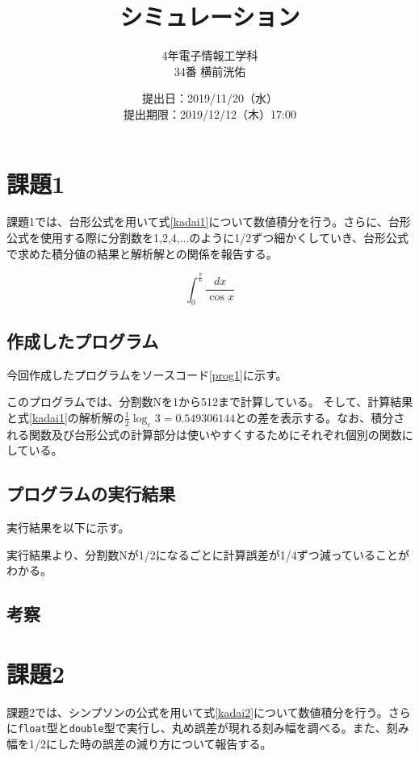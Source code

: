 \documentclass[10pt,titlepage]{jsarticle}
\title{シミュレーション}
\author{4年電子情報工学科\\34番 横前洸佑}
\date{提出日：2019/11/20（水）\\	提出期限：2019/12/12（木）17:00}
\begin{document}
\maketitle

\section{課題1}
課題1では、台形公式を用いて式\ref{kadai1}について数値積分を行う。さらに、台形公式を使用する際に分割数を1,2,4,...のように1/2ずつ細かくしていき、台形公式で求めた積分値の結果と解析解との関係を報告する。

\begin{equation}
\label{kadai1}
	\int_0^\frac{\pi}{6} \frac{dx}{\cos x}
\end{equation}

\subsection{作成したプログラム}
今回作成したプログラムをソースコード\ref{prog1}に示す。



このプログラムでは、分割数Nを1から512まで計算している。
そして、計算結果と式\ref{kadai1}の解析解の$\frac{1}{2}\log_e3=0.549306144$との差を表示する。なお、積分される関数及び台形公式の計算部分は使いやすくするためにそれぞれ個別の関数にしている。

\subsection{プログラムの実行結果}
実行結果を以下に示す。
\begin{oframed}
\end{oframed}

実行結果より、分割数Nが1/2になるごとに計算誤差が1/4ずつ減っていることがわかる。

\subsection{考察}


\section{課題2}
課題2では、シンプソンの公式を用いて式\ref{kadai2}について数値積分を行う。さらに{\tt float}型と{\tt double}型で実行し、丸め誤差が現れる刻み幅を調べる。また、刻み幅を1/2にした時の誤差の減り方について報告する。
\end{document}
